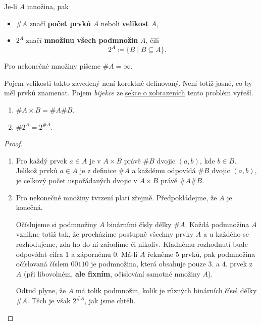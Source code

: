 \begin{definition}
 Je-li $A$ množina, pak
 \begin{itemize}
  \item $\#A$ značí \textbf{počet prvků} $A$ neboli \textbf{velikost} $A$,
  \item $2^{A}$ značí \textbf{množinu všech podmnožin} $A$, čili
   \[
    2^{A} \coloneqq \{B \mid B \subseteq A\}.
   \]
 \end{itemize}
 Pro nekonečné množiny píšeme $\#A = \infty$.
\end{definition}

\begin{warning}
 Pojem velikosti takto zavedený není korektně definovaný. Není totiž jasné, co
 by měl  prvků znamenat. Pojem \emph{bijekce} ze
 \hyperref[ssec:zobrazeni] {sekce o zobrazeních} tento problém vyřeší.
\end{warning}

\begin{claim}
 \label{claim:vlastnosti-velikosti-mnoziny}
 \hfill
 \vspace*{-.5\parskip}
 \begin{enumerate}
  \item $\#A \times B = \#A\#B$.
  \item $\#2^{A} = 2^{\# A}$.
 \end{enumerate}
\end{claim}
\begin{proof}
 \hfill
 \vspace*{-.5\parskip}
 \begin{enumerate}
  \item Pro každý prvek $a \in A$ je v $A \times B$ právě $\# B$ dvojic $(a,b)$,
   kde $b \in B$. Jelikož prvků $a \in A$ je z definice $\# A$ a každému
   odpovídá $\# B$ dvojic $(a,b)$, je celkový počet uspořádaných dvojic v $A
   \times B$ právě $\# A \# B$.
  \item Pro nekonečné množiny tvrzení platí zřejmě. Předpokládejme, že $A$ je
   konečná.
   
   Očíslujeme si podmnožiny $A$ binárními čísly délky $\# A$. Každá podmnožina
   $A$ vznikne totiž tak, že procházíme postupně všech\-ny prvky $A$ a u každého
   se rozhodujeme, zda ho do ní zařadíme či nikoliv. Kladnému rozhodnutí bude
   odpovídat cifra $1$ a zápornému $0$. Má-li $A$ řekněme $5$ prvků, pak
   podmnožina očíslovaná číslem $00110$ je podmnožina, která obsahuje pouze $3.$
   a $4.$ prvek z $A$ (při libovolném, \textbf{ale fixním}, očíslování samotné
   množiny $A$).

   Odtud plyne, že $A$ má tolik podmnožin, kolik je různých binárních čísel
   délky $\# A$. Těch je však $2^{\# A}$, jak jsme chtěli.\qedhere
 \end{enumerate}
\end{proof}
